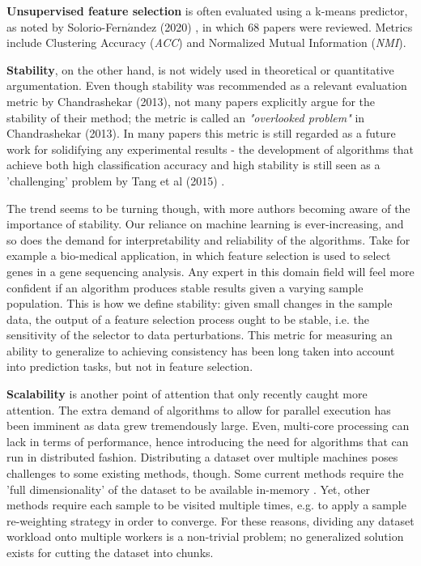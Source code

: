 \documentclass{article}
\begin{document}
\textbf{Unsupervised feature selection} is often evaluated using a k-means predictor, as noted by Solorio-Fern$\acute{a}$ndez (2020) \citep{solorio2020review}, in which 68 papers were reviewed. Metrics include Clustering Accuracy (\textit{ACC}) and Normalized Mutual Information (\textit{NMI}). 

\textbf{Stability}, on the other hand, is not widely used in theoretical or quantitative argumentation. Even though stability was recommended as a relevant evaluation metric by Chandrashekar (2013), not many papers explicitly argue for the stability of their method; the metric is called an \textit{"overlooked problem"} in Chandrashekar (2013). In many papers this metric is still regarded as a future work for solidifying any experimental results - the development of algorithms that achieve both high classification accuracy and high stability is still seen as a 'challenging' problem by Tang et al (2015) \citep{tang2014feature}.

The trend seems to be turning though, with more authors becoming aware of the importance of stability. Our reliance on machine learning is ever-increasing, and so does the demand for interpretability and reliability of the algorithms. Take for example a bio-medical application, in which feature selection is used to select genes in a gene sequencing analysis. Any expert in this domain field will feel more confident if an algorithm produces stable results given a varying sample population. This is how we define stability: given small changes in the sample data, the output of a feature selection process ought to be stable, i.e. the sensitivity of the selector to data perturbations. This metric for measuring an ability to generalize to achieving consistency has been long taken into account into prediction tasks, but not in feature selection.

\textbf{Scalability} is another point of attention that only recently caught more attention. The extra demand of algorithms to allow for parallel execution has been imminent as data grew tremendously large. Even, multi-core processing can lack in terms of performance, hence introducing the need for algorithms that can run in distributed fashion. Distributing a dataset over multiple machines poses challenges to some existing methods, though. Some current methods require the 'full dimensionality' of the dataset to be available in-memory \citep{tang2014feature}. Yet, other methods require each sample to be visited multiple times, e.g. to apply a sample re-weighting strategy in order to converge. For these reasons, dividing any dataset workload onto multiple workers is a non-trivial problem; no generalized solution exists for cutting the dataset into chunks.
\end{document}
